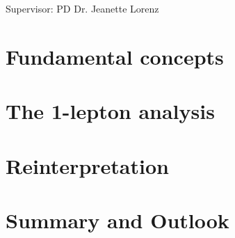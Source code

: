\documentclass[a4paper,11pt,numbered,pdftex,dvipsnames]{Classes/PhDThesisPSnPDF}
\begin{document}
\frontmatter

\maketitle

\cleardoublepage

\makegermantitle
\newpage
Supervisor: PD\@\xspace Dr.\@\xspace Jeanette Lorenz






\tableofcontents

%




\mainmatter

\listoftodos[Notes]


\part{Fundamental concepts}




\part{The 1-lepton analysis}






\part{Reinterpretation}



\part{Summary and Outlook}


\end{document}
